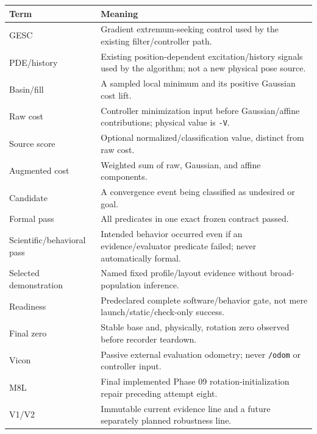 \documentclass[
  10pt,
  letterpaper,
]{article}
\newcounter{none} %
\begin{document}
{\def\LTcaptype{none} %
\begin{longtable}[]{@{}
  >{\raggedright\arraybackslash}p{}
  >{\raggedright\arraybackslash}p{}@{}}
\toprule\noalign{}
\begin{minipage}[b]{\linewidth}\raggedright
Term
\end{minipage} & \begin{minipage}[b]{\linewidth}\raggedright
Meaning
\end{minipage} \\
\midrule\noalign{}
\endhead
\bottomrule\noalign{}
\endlastfoot
GESC & Gradient extremum-seeking control used by the existing filter/controller path. \\
PDE/history & Existing position-dependent excitation/history signals used by the algorithm; not a new physical pose source. \\
Basin/fill & A sampled local minimum and its positive Gaussian cost lift. \\
Raw cost & Controller minimization input before Gaussian/affine contributions; physical value is \nolinkurl{-V}. \\
Source score & Optional normalized/classification value, distinct from raw cost. \\
Augmented cost & Weighted sum of raw, Gaussian, and affine components. \\
Candidate & A convergence event being classified as undesired or goal. \\
Formal pass & All predicates in one exact frozen contract passed. \\
Scientific/behavioral pass & Intended behavior occurred even if an evidence/evaluator predicate failed; never automatically formal. \\
Selected demonstration & Named fixed profile/layout evidence without broad-population inference. \\
Readiness & Predeclared complete software/behavior gate, not mere launch/static/check-only success. \\
Final zero & Stable base and, physically, rotation zero observed before recorder teardown. \\
Vicon & Passive external evaluation odometry; never \nolinkurl{/odom} or controller input. \\
M8L & Final implemented Phase 09 rotation-initialization repair preceding attempt eight. \\
V1/V2 & Immutable current evidence line and a future separately planned robustness line. \\
\end{longtable}
}
\end{document}
